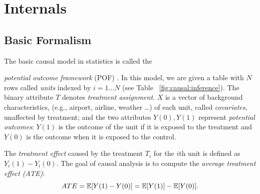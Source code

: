 \section{Internals}
\subsection{Basic Formalism}

The basic causal model in statistics is called the
{\em potential outcome framework} (POF) \cite{Rubin2005}.
In this model, we are given a table with $N$ rows called {\em units} indexed by $i=1 \ldots N$ (see
Table~ \ref{fig:causal:inference}).  The binary attribute $T$ denotes {\em treatment assignment}.
$X$ is a vector of
background characteristics, (e.g., airport, airline, weather \ldots) of each unit,
called {\em covariates}, unaffected by treatment; and the two
attributes $Y(0), Y(1)$ represent {\em potential outcomes}: $Y(1)$ is
the outcome of the unit if it is exposed to the treatment and $Y(0)$
is the outcome when it is exposed to the control.

The {\em treatment effect}
caused by the treatment $T_i$ for the $i$th unit  is defined as $Y_i(1)-Y_i(0)$.
The goal of causal analysis is to compute the {\em average treatment
  effect (ATE)}:   $$ATE = \mathbb{E}[Y(1)-Y(0)] = \mathbb{E}[Y(1)] - \mathbb{E}[Y(0)].$$


